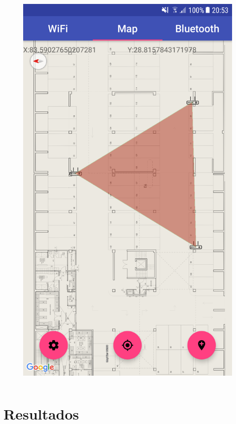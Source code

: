 \documentclass[mathserif]{beamer}
\begin{document}
\begin{frame}
\begin{columns}
\begin{figure}
\includegraphics[width=\textwidth]{../figures_chesta/implementacion/triangle_area}
\end{figure}

\end{columns}

\end{frame}


\section{Resultados}
\end{document}
